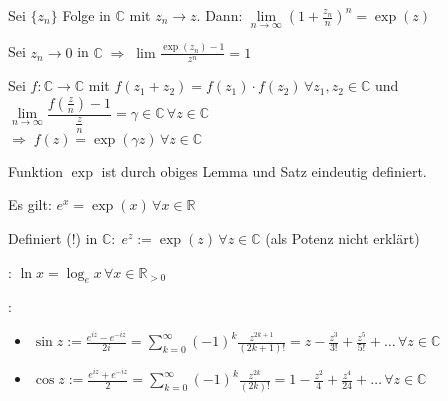 \begin{proposition}
	Sei $\{z_n\}$ Folge in $\mathbb{C}$ mit $z_n\to z$. Dann: $\lim\limits_{n\rightarrow\infty} \left( 1 + \frac{z_n}{n}\right)^n = \exp (z)$
\end{proposition}

\begin{lemma}
	Sei $z_n\to 0$ in $\mathbb{C}\;\Rightarrow\; \lim \frac{\exp(z_n) - 1}{z^n} = 1$
\end{lemma}

\begin{proposition}
	Sei $f:\mathbb{C}\rightarrow\mathbb{C}$ mit $f(z_1 + z_2) = f(z_1) \cdot f(z_2) \,\forall z_1, z_2\in\mathbb{C}$ und $\lim\limits_{n\rightarrow\infty} \dfrac{f\left( \frac{z}{n}\right) - 1}{\frac{z}{n}} = \gamma\in\mathbb{C}\,\forall z\in\mathbb{C}$ \\
	$\Rightarrow \;f(z) = \exp(\gamma z)\,\forall z\in\mathbb{C}$
\end{proposition}

\begin{conclusion}
	Funktion $\exp$ ist durch obiges Lemma und Satz eindeutig definiert.
\end{conclusion}
\begin{proposition}
	Es gilt: $e^x = \exp (x) \,\forall x\in \mathbb{R}$
	
	Definiert (!) in $\mathbb{C}:\; e^z := \exp(z) \,\forall z\in\mathbb{C}$ (als Potenz nicht erklärt)
\end{proposition}

\begin{*definition}
	: $\ln x = \log_e x\,\forall x\in\mathbb{R}_{>0}$
	
	:
	\begin{itemize}
		\item $\sin z := \frac{e^{iz} - e^{-iz}}{2i} = \sum_{k=0}^\infty (-1)^k \frac{z^{2k+1}}{(2k+1)!} = z - \frac{z^3}{3!} + \frac{z^5}{5!}+ \dotsc \,\forall z\in\mathbb{C}$
		\item $\cos z := \frac{e^{iz}+e^{-iz}}{2} = \sum_{k=0}^\infty (-1)^k \frac{z^{2k}}{(2k)!} = 1 - \frac{z^2}{4} + \frac{z^4}{24}+\dotsc \,\forall z\in\mathbb{C}$
	\end{itemize}
\end{*definition}

